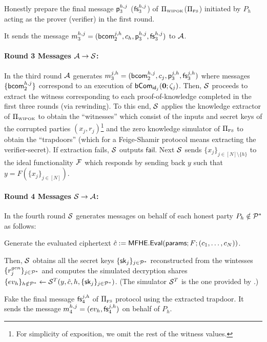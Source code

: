 \item Honestly prepare the final message $\mathsf{p}_3^{h,j}$ ($\mathsf{fs}_3^{h,j}$) of $\Pi_{\scriptscriptstyle\mathrm{WIPOK}}$($\Pi_{\scriptscriptstyle\mathrm{FS}}$) initiated by $P_h$ acting as the prover (verifier) in the first round. 

\item It sends the message $m^{h,j}_3=({\mathsf{bcom}}^{j,h}_2,c_h, \mathsf{p}^{h,j}_3,\mathsf{fs}^{h,j}_3)$ to ${\cal A}$.
\EE

\paragraph{Round 3 Messages ${\cal A} \rightarrow {\cal S}$:} In the third round ${\cal A}$ generates $m^{j,h}_3=({\mathsf{bcom}}^{h,j}_2,c_j, \mathsf{p}^{j,h}_3,\mathsf{fs}^{j,h}_3)$ where messages $\{{\mathsf{bcom}}^{h,j}_2\}$ correspond to an execution of $\mathsf{bCom}_{\mathsf{id}_j}({\bf 0};\zeta_{j})$.
Then, ${\cal S}$ proceeds to extract the witness corresponding to each proof-of-knowledge completed in the first three rounds (via rewinding). To this end, ${\cal S}$ applies the knowledge extractor of $\Pi_{\scriptscriptstyle\mathrm{WIPOK}}$ to obtain the ``witnesses'' which consist of the inputs and secret keys of the corrupted parties $(x_{j},r_j)$\footnote{For simplicity of exposition, we omit the rest of the witness values.} and the zero knowledge simulator of $\Pi_{\scriptscriptstyle\mathrm{FS}}$ to obtain the ``trapdoors'' (which for a Feige-Shamir protocol means extracting the verifier-secret). If extraction fails, ${\cal S}$ outputs $\mathsf{fail}$. Next ${\cal S}$ sends $\{x_j\}_{j\in[N]\setminus{\{h\}}}$ to the ideal functionality $\mathbf{\mathcal{F}}$ which responds by sending back $y$ such that $y = F(\{x_j\}_{j \in [N]})$.


\paragraph{Round 4 Messages ${\cal S} \rightarrow {\cal A}$:}  In the fourth round ${\cal S}$ generates messages on behalf of each honest party $P_h\notin{\cal P}^*$ as follows:
\BE
\item Generate the evaluated ciphertext ${{\hat{c}}}:= {\mathsf{MFHE.Eval}}({\mathsf{params}}; F; (c_1,\ldots, c_N))$.
\item Then, ${\cal S}$ obtains all the secret keys $\{{\mathsf{sk}}_j\}_{j\in{\cal P}^*}$ reconstructed from the wintesses $\{r^{gen}_j\}_{j\in{\cal P}^*}$ and computes the simulated decryption shares $\{ev_h\}_{h\notin{\cal P}^*}\leftarrow {\cal S}^T(y, {{\hat{c}}},h,\{{\mathsf{sk}}_j\}{_{j\in{\cal P}^*}})$. (The simulator ${\cal S}^T$ is the one provided by \cite[Section~6.2]{MW16}.)
\item Fake the final message $\mathsf{fs}^{j,h}_4$ of $\Pi_{\scriptscriptstyle\mathrm{FS}}$ protocol using the extracted trapdoor.
It sends the message $m^{h,j}_4=(ev_h, \mathsf{fs}^{j,h}_4)$ on behalf of $P_h$. 
\EE



